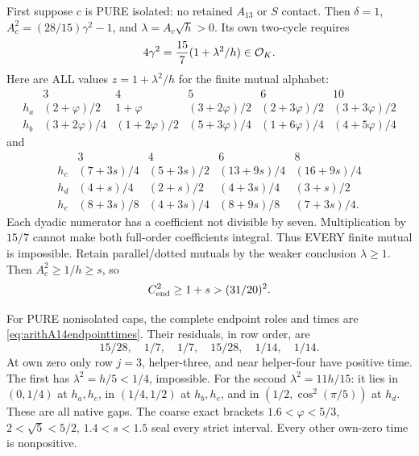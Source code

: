\documentclass[11pt]{article}
\begin{document}
First suppose \(c\) is PURE isolated:
no retained \(A_{13}\) or \(S\) contact.
Then \(\delta=1\),
\(A_c^2=(28/15)\gamma^2-1\),
and \(\lambda=A_c\sqrt h>0\).
Its own two-cycle requires
\[
                    4\gamma^2={15\over7}(1+\lambda^2/h)
                                     \in\mathcal O_K .
\]
Here are ALL values \(z=1+\lambda^2/h\)
for the finite mutual alphabet:
\[
 \begin{array}{c|ccccc}
 &3&4&5&6&10\\ \hline
 h_a&(2+\varphi)/2&1+\varphi&(3+2\varphi)/2&
                    (2+3\varphi)/2&(3+3\varphi)/2\\
 h_b&(3+2\varphi)/4&(1+2\varphi)/2&(5+3\varphi)/4&
                    (1+6\varphi)/4&(4+5\varphi)/4
 \end{array}
\]
and
\[
 \begin{array}{c|cccc}
 &3&4&6&8\\ \hline
 h_c&(7+3s)/4&(5+3s)/2&(13+9s)/4&(16+9s)/4\\
 h_d&(4+s)/4&(2+s)/2&(4+3s)/4&(3+s)/2\\
 h_e&(8+3s)/8&(4+3s)/4&(8+9s)/8&(7+3s)/4 .
 \end{array}
\]
Each dyadic numerator has a coefficient
not divisible by seven.
Multiplication by \(15/7\) cannot make
both full-order coefficients integral.
Thus EVERY finite mutual is impossible.
Retain parallel/dotted mutuals by the
weaker conclusion \(\lambda\ge1\).
Then \(A_c^2\ge1/h\ge s\), so
\[
                  C_{\rm end}^2\ge1+s>(31/20)^2 .
\]

For PURE nonisolated caps, the complete
endpoint roles and times are
\eqref{eq:arithA14endpointtimes}.
Their residuals, in row order, are
\[
                         15/28,\quad1/7,\quad1/7,\quad15/28,
                                      \quad1/14,\quad1/14 .
\]
At own zero only row \(j=3\), helper-three,
and near helper-four have positive time.
The first has \(\lambda^2=h/5<1/4\),
impossible.
For the second \(\lambda^2=11h/15\):
it lies in \((0,1/4)\) at \(h_a,h_c\),
in \((1/4,1/2)\) at \(h_b,h_e\),
and in \((1/2,\cos^2(\pi/5))\) at \(h_d\).
These are all native gaps.
The coarse exact brackets
\(1.6<\varphi<5/3\),
\(2<\sqrt5<5/2\), \(1.4<s<1.5\)
seal every strict interval.
Every other own-zero time is nonpositive.
\end{document}
